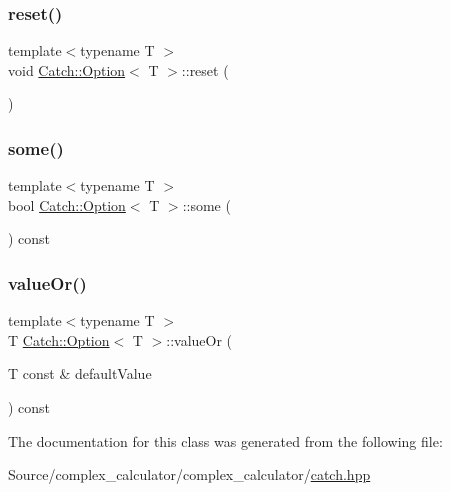 \mbox{\label{class_catch_1_1_option_a37b4e0e5d4d56296adacd267a616f4e0}} 
\subsubsection{\texorpdfstring{reset()}{reset()}}
{\footnotesize\ttfamily template$<$typename T $>$ \\
void \mbox{\hyperlink{class_catch_1_1_option}{Catch\+::\+Option}}$<$ T $>$\+::reset (\begin{DoxyParamCaption}{ }\end{DoxyParamCaption})\hspace{0.3cm}{\ttfamily [inline]}}

\mbox{\label{class_catch_1_1_option_a97c95829afbe92f2bcc5fd75b32c0825}} 
\subsubsection{\texorpdfstring{some()}{some()}}
{\footnotesize\ttfamily template$<$typename T $>$ \\
bool \mbox{\hyperlink{class_catch_1_1_option}{Catch\+::\+Option}}$<$ T $>$\+::some (\begin{DoxyParamCaption}{ }\end{DoxyParamCaption}) const\hspace{0.3cm}{\ttfamily [inline]}}

\mbox{\label{class_catch_1_1_option_a8d9ae2e30b0eb76fe134a6fbc8423124}} 
\subsubsection{\texorpdfstring{value\+Or()}{valueOr()}}
{\footnotesize\ttfamily template$<$typename T $>$ \\
T \mbox{\hyperlink{class_catch_1_1_option}{Catch\+::\+Option}}$<$ T $>$\+::value\+Or (\begin{DoxyParamCaption}\item[{T const \&}]{default\+Value }\end{DoxyParamCaption}) const\hspace{0.3cm}{\ttfamily [inline]}}



The documentation for this class was generated from the following file\+:\begin{DoxyCompactItemize}
\item 
Source/complex\+\_\+calculator/complex\+\_\+calculator/\mbox{\hyperlink{catch_8hpp}{catch.\+hpp}}\end{DoxyCompactItemize}
